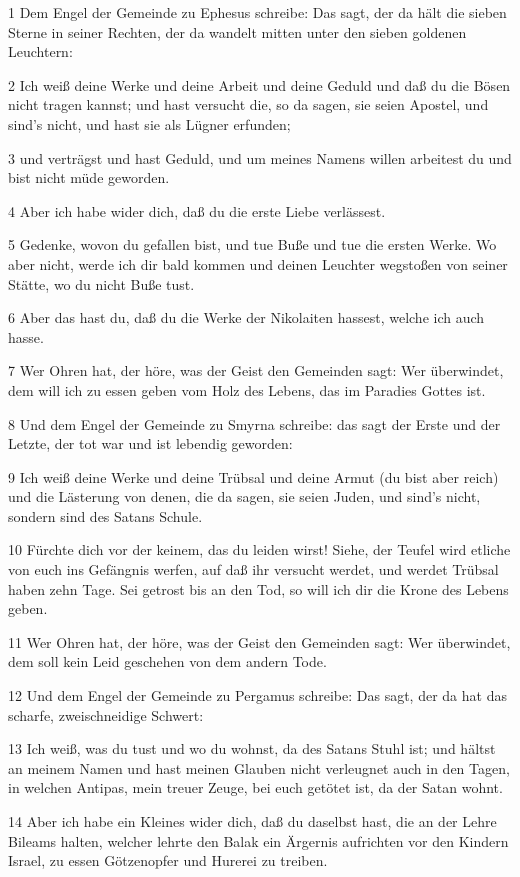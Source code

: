 \par 1 Dem Engel der Gemeinde zu Ephesus schreibe: Das sagt, der da hält die sieben Sterne in seiner Rechten, der da wandelt mitten unter den sieben goldenen Leuchtern:
\par 2 Ich weiß deine Werke und deine Arbeit und deine Geduld und daß du die Bösen nicht tragen kannst; und hast versucht die, so da sagen, sie seien Apostel, und sind's nicht, und hast sie als Lügner erfunden;
\par 3 und verträgst und hast Geduld, und um meines Namens willen arbeitest du und bist nicht müde geworden.
\par 4 Aber ich habe wider dich, daß du die erste Liebe verlässest.
\par 5 Gedenke, wovon du gefallen bist, und tue Buße und tue die ersten Werke. Wo aber nicht, werde ich dir bald kommen und deinen Leuchter wegstoßen von seiner Stätte, wo du nicht Buße tust.
\par 6 Aber das hast du, daß du die Werke der Nikolaiten hassest, welche ich auch hasse.
\par 7 Wer Ohren hat, der höre, was der Geist den Gemeinden sagt: Wer überwindet, dem will ich zu essen geben vom Holz des Lebens, das im Paradies Gottes ist.
\par 8 Und dem Engel der Gemeinde zu Smyrna schreibe: das sagt der Erste und der Letzte, der tot war und ist lebendig geworden:
\par 9 Ich weiß deine Werke und deine Trübsal und deine Armut (du bist aber reich) und die Lästerung von denen, die da sagen, sie seien Juden, und sind's nicht, sondern sind des Satans Schule.
\par 10 Fürchte dich vor der keinem, das du leiden wirst! Siehe, der Teufel wird etliche von euch ins Gefängnis werfen, auf daß ihr versucht werdet, und werdet Trübsal haben zehn Tage. Sei getrost bis an den Tod, so will ich dir die Krone des Lebens geben.
\par 11 Wer Ohren hat, der höre, was der Geist den Gemeinden sagt: Wer überwindet, dem soll kein Leid geschehen von dem andern Tode.
\par 12 Und dem Engel der Gemeinde zu Pergamus schreibe: Das sagt, der da hat das scharfe, zweischneidige Schwert:
\par 13 Ich weiß, was du tust und wo du wohnst, da des Satans Stuhl ist; und hältst an meinem Namen und hast meinen Glauben nicht verleugnet auch in den Tagen, in welchen Antipas, mein treuer Zeuge, bei euch getötet ist, da der Satan wohnt.
\par 14 Aber ich habe ein Kleines wider dich, daß du daselbst hast, die an der Lehre Bileams halten, welcher lehrte den Balak ein Ärgernis aufrichten vor den Kindern Israel, zu essen Götzenopfer und Hurerei zu treiben.
